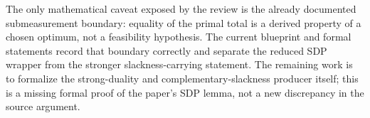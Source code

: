 \documentclass[11pt]{article}
\begin{document}
The only mathematical caveat exposed by the review is the already documented
submeasurement boundary: equality of the primal total is a derived property of a
chosen optimum, not a feasibility hypothesis.  The current blueprint and formal
statements record that boundary correctly and separate the reduced SDP wrapper
from the stronger slackness-carrying statement.  The remaining work is to
formalize the strong-duality and complementary-slackness producer itself; this
is a missing formal proof of the paper's SDP lemma, not a new discrepancy in the
source argument.



\end{document}
